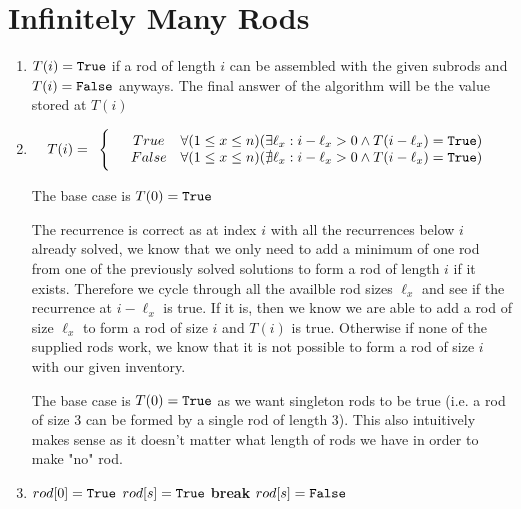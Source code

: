 \documentclass{article}
\begin{document}
\section{Infinitely Many Rods}
\begin{enumerate}
    \item $T(i) = \texttt{True}$ if a rod of length $i$ can be assembled with the given subrods and $T(i) = \texttt{False}$ anyways.
            The final answer of the algorithm will be the value stored at $T(i)$
    \item         
        \begin{align*}
            T(i) = 
            \begin{array}{cc}
                \Bigg\{ & 
                \begin{array}{cc}
                    True & \forall (1 \leq x \leq n)(\exists \ell_x: i-\ell_x > 0 \land T(i-\ell_x) = \texttt{True})   \\
                    False & \forall (1 \leq x \leq n)(\nexists \ell_x: i-\ell_x > 0 \land T(i-\ell_x) = \texttt{True})
                \end{array}
            \end{array}
        \end{align*}

        The base case is $T(0) = \texttt{True}$

        The recurrence is correct as at index $i$ with all the recurrences below $i$ already solved, we know that we only need to add a minimum of one rod from one of the previously solved solutions to form a rod of length $i$ if it exists.
        Therefore we cycle through all the availble rod sizes $\ell_x$ and see if the recurrence at $i - \ell_x$ is true. If it is, then we know we are able to add a rod of size $\ell_x$ to form a rod of size $i$ and $T(i)$ is true.
        Otherwise if none of the supplied rods work, we know that it is not possible to form a rod of size $i$ with our given inventory. 

        The base case is $T(0) = \texttt{True}$ as we want singleton rods to be true (i.e. a rod of size 3 can be formed by a single rod of length 3). 
        This also intuitively makes sense as it doesn't matter what length of rods we have in order to make "no" rod.

    \item 
        \begin{algorithmic}
                \State $rod[0] = \texttt{True}$
                            \State $rod[s] = \texttt{True}$
                            \State \textbf{break}
                        \Else
                            \State $rod[s] = \texttt{False}$
                        \EndIf
                    \EndFor
                \EndFor


\end{algorithmic}
\end{enumerate}
\end{document}
